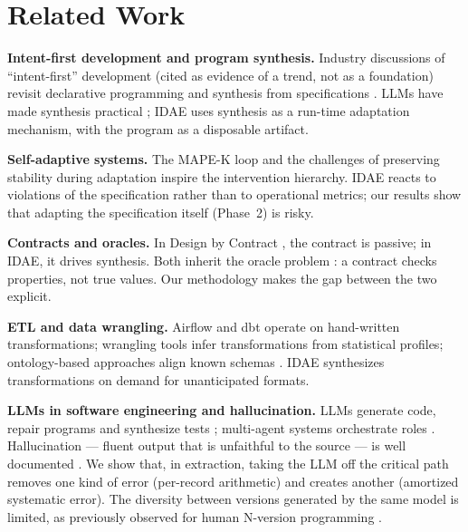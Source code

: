 \documentclass[sigconf,nonacm]{acmart}
\begin{document}
\section{Related Work}

\textbf{Intent-first development and program synthesis.} Industry discussions of ``intent-first'' development \cite{shoukry2026future} (cited as evidence of a trend, not as a foundation) revisit declarative programming \cite{lloyd1994practical} and synthesis from specifications \cite{gulwani2017program}. LLMs have made synthesis practical \cite{chen2021evaluating}; IDAE uses synthesis as a run-time adaptation mechanism, with the program as a disposable artifact.

\textbf{Self-adaptive systems.} The MAPE-K loop \cite{kephart2003vision} and the challenges of preserving stability during adaptation \cite{salehie2009self,cheng2009software} inspire the intervention hierarchy. IDAE reacts to violations of the specification rather than to operational metrics; our results show that adapting the specification itself (Phase~2) is risky.

\textbf{Contracts and oracles.} In Design by Contract \cite{meyer1997object}, the contract is passive; in IDAE, it drives synthesis. Both inherit the oracle problem \cite{barr2015oracle}: a contract checks properties, not true values. Our methodology makes the gap between the two explicit.

\textbf{ETL and data wrangling.} Airflow \cite{airflow2023} and dbt \cite{dbt2024} operate on hand-written transformations; wrangling tools \cite{kandel2011wrangler} infer transformations from statistical profiles; ontology-based approaches align known schemas \cite{santosjunior2023federated}. IDAE synthesizes transformations on demand for unanticipated formats.

\textbf{LLMs in software engineering and hallucination.} LLMs generate code, repair programs and synthesize tests \cite{chen2021evaluating,prenner2022automatic,schafer2023empirical}; multi-agent systems orchestrate roles \cite{qian2024communicative,hong2024metagpt}. Hallucination --- fluent output that is unfaithful to the source --- is well documented \cite{ji2023survey}. We show that, in extraction, taking the LLM off the critical path removes one kind of error (per-record arithmetic) and creates another (amortized systematic error). The diversity between versions generated by the same model is limited, as previously observed for human N-version programming \cite{knight1986experimental}.
\end{document}

